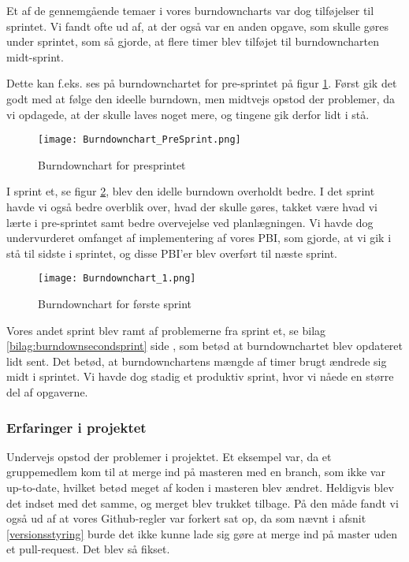 Et af de gennemgående temaer i vores burndowncharts var dog tilføjelser til sprintet.
Vi fandt ofte ud af, at der også var en anden opgave, som skulle gøres under sprintet, som så gjorde, at flere timer blev tilføjet til burndowncharten midt-sprint. 

Dette kan f.eks. ses på burndownchartet for pre-sprintet på figur \ref{fig:burndownpresprint}.
Først gik det godt med at følge den ideelle burndown, men midtvejs opstod der problemer, da vi opdagede, at der skulle laves noget mere, og tingene gik derfor lidt i stå.

\begin{figure}[H]
    \caption{Burndownchart for presprintet}
    \centering
        \texttt{[image: Burndownchart\_PreSprint.png]}
    \label{fig:burndownpresprint}
\end{figure}

I sprint et, se figur \ref{fig:burndownfirstsprint}, blev den idelle burndown overholdt bedre.
I det sprint havde vi også bedre overblik over, hvad der skulle gøres, takket være hvad vi lærte i pre-sprintet samt bedre overvejelse ved planlægningen.
Vi havde dog undervurderet omfanget af implementering af vores PBI, som gjorde, at vi gik i stå til sidste i sprintet, og disse PBI'er blev overført til næste sprint.

\begin{figure}[H]
    \caption{Burndownchart for første sprint}
    \centering
        \texttt{[image: Burndownchart\_1.png]}
    \label{fig:burndownfirstsprint}
\end{figure}

Vores andet sprint blev ramt af problemerne fra sprint et, se bilag \ref{bilag:burndownsecondsprint} side \pageref{bilag:burndownsecondsprint}, som betød at burndownchartet blev opdateret lidt sent.
Det betød, at burndownchartens mængde af timer brugt ændrede sig midt i sprintet.
Vi havde dog stadig et produktiv sprint, hvor vi nåede en større del af opgaverne.



\subsubsection{Erfaringer i projektet}

Undervejs opstod der problemer i projektet.
Et eksempel var, da et gruppemedlem kom til at merge ind på masteren med en branch, som ikke var up-to-date, hvilket betød meget af koden i masteren blev ændret.
Heldigvis blev det indset med det samme, og merget blev trukket tilbage.
På den måde fandt vi også ud af at vores Github-regler var forkert sat op, da som nævnt i afsnit \ref{versionsstyring} burde det ikke kunne lade sig gøre at merge ind på master uden et pull-request.
Det blev så fikset.

